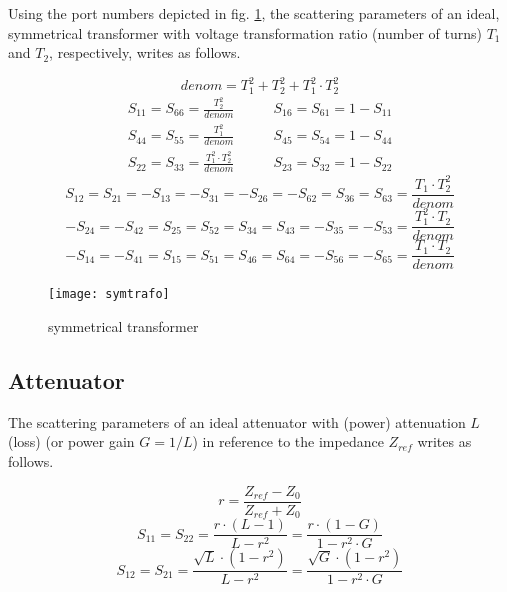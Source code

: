 \documentclass[10pt]{report}
\begin{document}
Using the port numbers depicted in fig. \ref{fig:symtrafo}, the
scattering parameters of an ideal, symmetrical transformer with
voltage transformation ratio (number of turns) $T_1$ and $T_2$,
respectively, writes as follows.

\begin{equation}
denom = T_1^2+T_2^2+T_1^2\cdot T_2^2
\end{equation}
\begin{eqnarray}
S_{11} = S_{66} = \frac{T_2^2}{denom}  &  \qquad S_{16} = S_{61} = 1-S_{11} \\
S_{44} = S_{55} = \frac{T_1^2}{denom}  &  \qquad S_{45} = S_{54} = 1-S_{44} \\
S_{22} = S_{33} = \frac{T_1^2\cdot T_2^2}{denom}  &  \qquad S_{23} = S_{32} = 1-S_{22}
\end{eqnarray}
\begin{equation}
S_{12} = S_{21} = -S_{13} = -S_{31} = -S_{26} = -S_{62} = S_{36} = S_{63}
       = \frac{T_1\cdot T_2^2}{denom}
\end{equation}
\begin{equation}
-S_{24} = -S_{42} = S_{25} = S_{52} = S_{34} = S_{43} = -S_{35} = -S_{53}
       = \frac{T_1^2\cdot T_2}{denom}
\end{equation}
\begin{equation}
-S_{14} = -S_{41} = S_{15} = S_{51} = S_{46} = S_{64} = -S_{56} = -S_{65}
       = \frac{T_1\cdot T_2}{denom}
\end{equation}

\begin{figure}[ht]
\begin{center}
\texttt{[image: symtrafo]}
\end{center}
\caption{symmetrical transformer}
\label{fig:symtrafo}
\end{figure}
\FloatBarrier

\subsection{Attenuator}

The scattering parameters of an ideal attenuator with (power) attenuation $L$
(loss) (or power gain $G=1/L$) in reference to the impedance $Z_{ref}$ writes as follows.

\begin{equation}
r = \frac{Z_{ref}-Z_0}{Z_{ref}+Z_0}
\end{equation}
\begin{equation}
S_{11} = S_{22} = \frac{r\cdot(L-1)}{L-r^2} = \frac{r\cdot(1-G)}{1-r^2\cdot G}
\end{equation}
\begin{equation}
S_{12} = S_{21} = \frac{\sqrt{L}\cdot(1-r^2)}{L-r^2} = \frac{\sqrt{G}\cdot(1-r^2)}{1-r^2\cdot G}
\end{equation}
\end{document}
